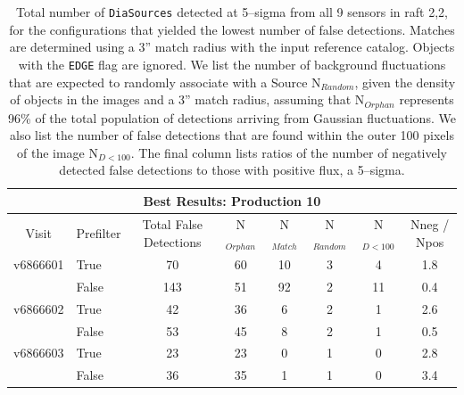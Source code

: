 \documentclass[prd, nofootinbib, floatfix, 11pt,tightenlines,times]{article}
\begin{document}
\clearpage



\clearpage
\begin{table}
\centering
\begin{tabular}{clcccccc}
\hline
\multicolumn{8}{|c|}{Best Results: Production 10} \\
\hline
Visit    & Prefilter & Total False Detections &  N$_{Orphan}$ & N$_{Match}$ & N$_{Random}$ & N$_{D<100}$ & Nneg / Npos \\
\hline
v6866601 & True      & 70      &60         & 10 & 3     & 4   & 1.8 \\ 
         & False     & 143     &51         & 92 & 2     & 11  & 0.4 \\
v6866602 & True      & 42      &36         & 6  & 2     & 1   & 2.6 \\
         & False     & 53      &45         & 8  & 2     & 1   & 0.5 \\
v6866603 & True      & 23      &23         & 0  & 1     & 0   & 2.8 \\
         & False     & 36      &35         & 1  & 1     & 0   & 3.4 \\
\end{tabular}
\caption{Total number of {\tt DiaSources} detected at 5--sigma from
  all 9 sensors in raft 2,2, for the configurations that yielded the
  lowest number of false detections.  Matches are determined using a
  3'' match radius with the input reference catalog.  Objects with the
  {\tt EDGE} flag are ignored.  We list the number of background
  fluctuations that are expected to randomly associate with a Source
  N$_{Random}$, given the density of objects in the images and a 3''
  match radius, assuming that N$_{Orphan}$ represents 96\% of the
  total population of detections arriving from Gaussian fluctuations.
  We also list the number of false detections that are found within
  the outer 100 pixels of the image N$_{D<100}$.  The final column
  lists ratios of the number of negatively detected false detections
  to those with positive flux, a 5--sigma. \label{tab-bestfp10}}
\end{table}
\end{document}
